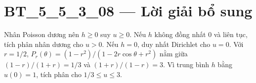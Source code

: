 \documentclass[10pt,a4paper]{article}
\begin{document}
\section*{BT\_5\_5\_3\_08 — Lời giải bổ sung}
Nhân Poisson dương nên $h\ge0$ suy $u\ge0$. Nếu $h$ không đồng nhất 0 và liên tục, tích phân nhân dương cho $u>0$. Nếu $h=0$, duy nhất Dirichlet cho $u=0$.
Với $r=1/2$, $P_r(\theta)=(1-r^2)/(1-2r\cos\theta+r^2)$ nằm giữa $(1-r)/(1+r)=1/3$ và $(1+r)/(1-r)=3$. Vì trung bình $h$ bằng $u(0)=1$, tích phân cho $1/3\le u\le3$.
\end{document}
